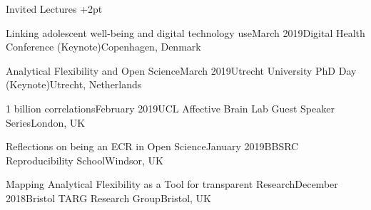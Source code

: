 \documentclass{resume} %
\begin{document}
\begin{rSection}{Invited Lectures} \itemsep +2pt

\begin{rSubsection}{Linking adolescent well-being and digital technology use}{March 2019}{Digital Health Conference (Keynote)}{Copenhagen, Denmark}
\item[]\vspace{-1.5\baselineskip}
\end{rSubsection}


\begin{rSubsection}{Analytical Flexibility and Open Science}{March 2019}{Utrecht University PhD Day (Keynote)}{Utrecht, Netherlands}
\item[]\vspace{-1.5\baselineskip}
\end{rSubsection}


\begin{rSubsection}{1 billion correlations}{February 2019}{UCL Affective Brain Lab Guest Speaker Series}{London, UK}
\item[]\vspace{-1.5\baselineskip}
\end{rSubsection}


\begin{rSubsection}{Reflections on being an ECR in Open Science}{January 2019}{BBSRC Reproducibility School}{Windsor, UK}
\item[]\vspace{-1.5\baselineskip}
\end{rSubsection}


\begin{rSubsection}{Mapping Analytical Flexibility as a Tool for transparent Research}{December 2018}{Bristol TARG Research Group}{Bristol, UK}
\item[]\vspace{-1.5\baselineskip}
\end{rSubsection}


\end{rSection}
\end{document}
